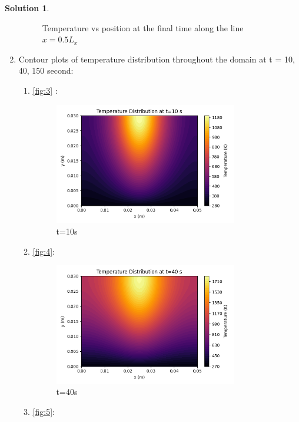 \documentclass[12pt]{article}
\theoremstyle{definition} %
\newtheorem{solution}{Solution}
\theoremstyle{plain} %
\begin{document}
\begin{solution}
\begin{enumerate}
\begin{figure}[htbp]
        \caption{Temperature vs position at the final time along the line $x = 0.5L_x$}
        \label{fig:2}
    \end{figure}
    \item Contour plots of temperature distribution throughout the domain at t = 10, 40, 150
    second:
    \begin{enumerate}
        \item \autoref{fig:3} : \begin{figure}[htbp]

            \centering
            \includegraphics[width=0.8\textwidth]{classes/tam-470/06-10/proj-2.2.4.1.png}
            \caption{t=10s}
            \label{fig:3}
        \end{figure}
        \item \autoref{fig:4}: \begin{figure}[htbp]
            \centering
            \includegraphics[width=0.8\textwidth]{classes/tam-470/06-10/proj-2.2.4.2.png}
            \caption{t=40s}
            \label{fig:4}
        \end{figure}
    \item \autoref{fig:5}: \begin{figure}[htbp]

\end{figure}
\end{enumerate}
\end{enumerate}
\end{solution}
\end{document}
